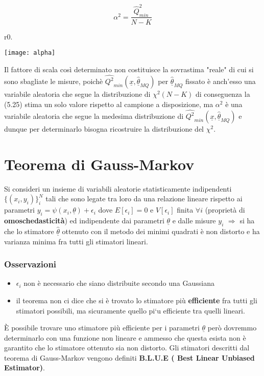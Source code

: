 \begin{equation}
	\alpha^2 = \dfrac{\hat{Q}_{min}^{2}}{N-K}
\end{equation}

\begin{wrapfigure}{r}{0.\textwidth}
\centering

\texttt{[image: alpha]}	

\end{wrapfigure}

\noindent Il fattore di scala cos\`{i} determinato non costituisce la sovrastima "reale" di cui si sono sbagliate le misure, poich\`{e} $\hat{Q^2}_{min}(\underline{x},\underline{\hat{\theta}}_{MQ})$ per $\underline{\hat{\theta}}_{MQ}$ fissato \`{e} anch'esso una variabile aleatoria  che segue la distribuzione di $\chi^2(N-K)$ di conseguenza la (5.25) stima un solo valore rispetto al campione a disposizione, ma $\alpha^2$ \`{e} una variabile aleatoria che segue la medesima distribuzione di $\hat{Q^2}_{min}(\underline{x},\underline{\hat{\theta}}_{MQ})$ e dunque per determinarlo bisogna ricostruire la distribuzione del $\chi^2$.

\section{Teorema di Gauss-Markov}
Si consideri un insieme di variabili aleatorie statisticamente indipendenti $\{(x_i,y_i)\}_i^N$ tali che sono legate tra loro da una relazione lineare rispetto ai parametri $y_i = \psi(x_i ,\underline{\theta}) + \epsilon_i$ dove $E[\epsilon_i] = 0$ e $V[\epsilon_i] $ finita $\forall i$ (propriet\`{a} di \textbf{omoschedasticit\`{a}}) ed indipendente dai parametri $\underline{\theta}$ e dalle misure $y_i$ $\Rightarrow$ si ha che lo stimatore $\underline{\hat{\theta}}$ ottenuto con il metodo dei minimi quadrati \`{e} non distorto e ha varianza minima fra tutti gli stimatori lineari.

\subsubsection{Osservazioni}

\begin{itemize}
	\item $\epsilon_{i}$ non \`{e} necessario che siano distribuite secondo una Gaussiana
	\item il teorema non ci dice che si \`{e} trovato lo stimatore pi\`{u} \textbf{efficiente} fra tutti gli stimatori possibili, ma sicuramente quello pi`{u} efficiente tra quelli lineari.
\end{itemize}  
\`{E} possibile trovare uno stimatore pi\`{u} efficiente per i parametri $\underline{\theta}$ per\`{o} dovremmo determinarlo con una funzione non lineare e ammesso che questa esista non \`{e} garantito che lo stimatore ottenuto sia non distorto.\newline
Gli stimatori descritti dal teorema di Gauss-Markov vengono definiti \textbf{B.L.U.E ( Best Linear Unbiased Estimator)}. 


